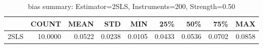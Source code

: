 \begin{table}[ht]
\centering
\caption{bias summary: Estimator=2SLS, Instruments=200, Strength=0.50}
\begin{tabular}{lrrrrrrrr}
\toprule
 & COUNT & MEAN & STD & MIN & 25\% & 50\% & 75\% & MAX \\
\midrule
2SLS & 10.0000 & 0.0522 & 0.0238 & 0.0105 & 0.0433 & 0.0536 & 0.0702 & 0.0858 \\
\bottomrule
\end{tabular}
\end{table}
